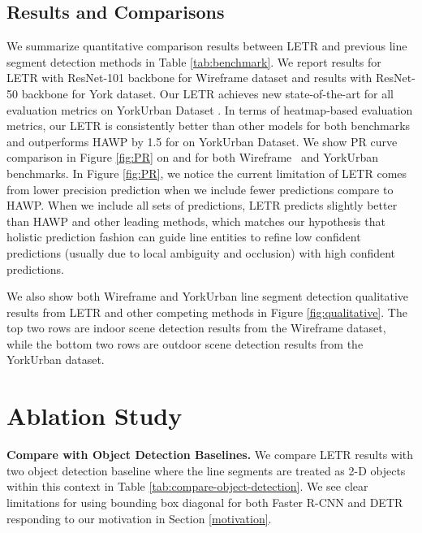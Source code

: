 \documentclass[final]{cvpr}
\begin{document}
\subsection{Results and Comparisons}
\vspace{-2mm}
\label{results_comparison}



We summarize quantitative comparison results between LETR and previous line segment detection methods in Table \ref{tab:benchmark}. We report results for LETR with ResNet-101 backbone for Wireframe dataset and results with ResNet-50 backbone for York dataset. Our LETR achieves new state-of-the-art for all evaluation metrics on YorkUrban Dataset \cite{denis2008efficient}. In terms of heatmap-based evaluation metrics, our LETR is consistently better than other models for both benchmarks and outperforms HAWP \cite{xue2020holistically} by 1.5 for  on YorkUrban Dataset. We show PR curve comparison in Figure \ref{fig:PR} on  and  for both Wireframe~\cite{huang2018learning} and YorkUrban benchmarks. In Figure \ref{fig:PR}, we notice the current limitation of LETR comes from lower precision prediction when we include fewer predictions compare to HAWP. When we include all sets of predictions, LETR predicts slightly better than HAWP and other leading methods, which matches our hypothesis that holistic prediction fashion can guide line entities to refine low confident predictions (usually due to local ambiguity and occlusion) with high confident predictions.  



We also show both Wireframe and YorkUrban line segment detection qualitative results from LETR and other competing methods in Figure \ref{fig:qualitative}. The top two rows are indoor scene detection results from the Wireframe dataset, while the bottom two rows are outdoor scene detection results from the YorkUrban dataset. 


\section{Ablation Study}
\vspace{-2mm}
\noindent\textbf{Compare with Object Detection Baselines.}
We compare LETR results with two object detection baseline where the line segments are treated as 2-D objects within this context in Table \ref{tab:compare-object-detection}. We see clear limitations for using bounding box diagonal for both Faster R-CNN and DETR responding to our motivation in Section \ref{motivation}. 
\end{document}
